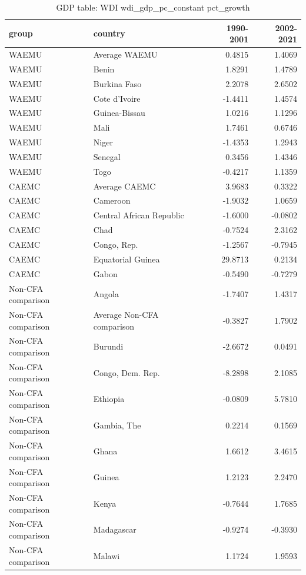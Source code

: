 \begin{table}

\caption{GDP table: WDI wdi_gdp_pc_constant pct_growth}
\centering
\begin{tabular}[t]{llrr}
\toprule
group & country & 1990-2001 & 2002-2021\\
\midrule
WAEMU & Average WAEMU & 0.4815 & 1.4069\\
WAEMU & Benin & 1.8291 & 1.4789\\
WAEMU & Burkina Faso & 2.2078 & 2.6502\\
WAEMU & Cote d'Ivoire & -1.4411 & 1.4574\\
WAEMU & Guinea-Bissau & 1.0216 & 1.1296\\
\addlinespace
WAEMU & Mali & 1.7461 & 0.6746\\
WAEMU & Niger & -1.4353 & 1.2943\\
WAEMU & Senegal & 0.3456 & 1.4346\\
WAEMU & Togo & -0.4217 & 1.1359\\
CAEMC & Average CAEMC & 3.9683 & 0.3322\\
\addlinespace
CAEMC & Cameroon & -1.9032 & 1.0659\\
CAEMC & Central African Republic & -1.6000 & -0.0802\\
CAEMC & Chad & -0.7524 & 2.3162\\
CAEMC & Congo, Rep. & -1.2567 & -0.7945\\
CAEMC & Equatorial Guinea & 29.8713 & 0.2134\\
\addlinespace
CAEMC & Gabon & -0.5490 & -0.7279\\
Non-CFA comparison & Angola & -1.7407 & 1.4317\\
Non-CFA comparison & Average Non-CFA comparison & -0.3827 & 1.7902\\
Non-CFA comparison & Burundi & -2.6672 & 0.0491\\
Non-CFA comparison & Congo, Dem. Rep. & -8.2898 & 2.1085\\
\addlinespace
Non-CFA comparison & Ethiopia & -0.0809 & 5.7810\\
Non-CFA comparison & Gambia, The & 0.2214 & 0.1569\\
Non-CFA comparison & Ghana & 1.6612 & 3.4615\\
Non-CFA comparison & Guinea & 1.2123 & 2.2470\\
Non-CFA comparison & Kenya & -0.7644 & 1.7685\\
\addlinespace
Non-CFA comparison & Madagascar & -0.9274 & -0.3930\\
Non-CFA comparison & Malawi & 1.1724 & 1.9593\\

\end{tabular}
\end{table}
